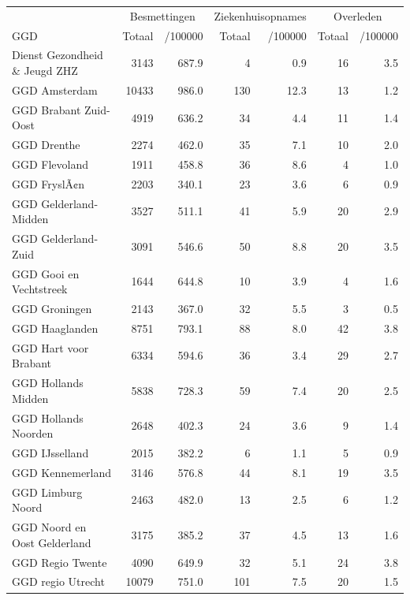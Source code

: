 \documentclass[
  english,
  man,floatsintext]{apa6}
\begin{document}
\begin{table}[H]
\centering\begingroup\fontsize{10}{12}\selectfont

\begin{threeparttable}
\begin{tabular}{lrrrrrr}
\toprule
\multicolumn{1}{c}{ } & \multicolumn{2}{c}{Besmettingen} & \multicolumn{2}{c}{Ziekenhuisopnames} & \multicolumn{2}{c}{Overleden} \\
\cmidrule(l{3pt}r{3pt}){2-3} \cmidrule(l{3pt}r{3pt}){4-5} \cmidrule(l{3pt}r{3pt}){6-7}
GGD & Totaal & /100000 & Totaal & /100000 & Totaal & /100000\\
\midrule
Dienst Gezondheid \& Jeugd ZHZ & 3143 & 687.9 & 4 & 0.9 & 16 & 3.5\\
GGD Amsterdam & 10433 & 986.0 & 130 & 12.3 & 13 & 1.2\\
GGD Brabant Zuid-Oost & 4919 & 636.2 & 34 & 4.4 & 11 & 1.4\\
GGD Drenthe & 2274 & 462.0 & 35 & 7.1 & 10 & 2.0\\
GGD Flevoland & 1911 & 458.8 & 36 & 8.6 & 4 & 1.0\\
GGD FryslÃ¢n & 2203 & 340.1 & 23 & 3.6 & 6 & 0.9\\
GGD Gelderland-Midden & 3527 & 511.1 & 41 & 5.9 & 20 & 2.9\\
GGD Gelderland-Zuid & 3091 & 546.6 & 50 & 8.8 & 20 & 3.5\\
GGD Gooi en Vechtstreek & 1644 & 644.8 & 10 & 3.9 & 4 & 1.6\\
GGD Groningen & 2143 & 367.0 & 32 & 5.5 & 3 & 0.5\\
GGD Haaglanden & 8751 & 793.1 & 88 & 8.0 & 42 & 3.8\\
GGD Hart voor Brabant & 6334 & 594.6 & 36 & 3.4 & 29 & 2.7\\
GGD Hollands Midden & 5838 & 728.3 & 59 & 7.4 & 20 & 2.5\\
GGD Hollands Noorden & 2648 & 402.3 & 24 & 3.6 & 9 & 1.4\\
GGD IJsselland & 2015 & 382.2 & 6 & 1.1 & 5 & 0.9\\
GGD Kennemerland & 3146 & 576.8 & 44 & 8.1 & 19 & 3.5\\
GGD Limburg Noord & 2463 & 482.0 & 13 & 2.5 & 6 & 1.2\\
GGD Noord en Oost Gelderland & 3175 & 385.2 & 37 & 4.5 & 13 & 1.6\\
GGD Regio Twente & 4090 & 649.9 & 32 & 5.1 & 24 & 3.8\\
GGD regio Utrecht & 10079 & 751.0 & 101 & 7.5 & 20 & 1.5\\

\end{tabular}
\end{threeparttable}
\end{table}
\end{document}
